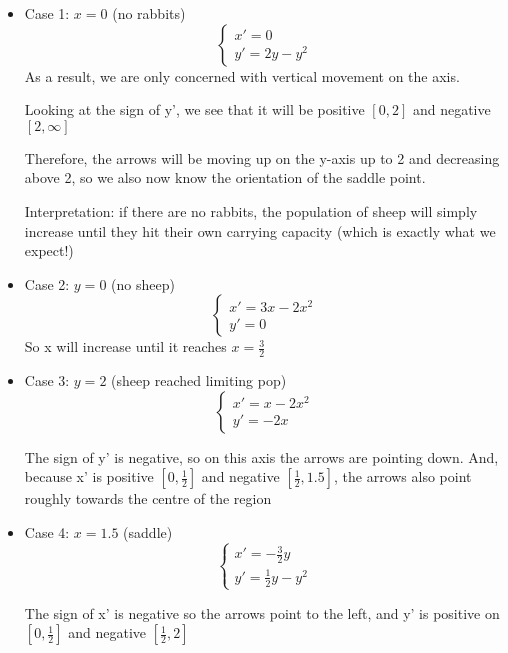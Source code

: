 \documentclass[12pt]{article}
\begin{document}
\begin{itemize}
    \item Case 1: $x = 0$ (no rabbits)
        \[\begin{cases}
            x' = 0\\
            y' = 2y - y^2
        \end{cases}\]
        As a result, we are only concerned with vertical movement on the axis.

        Looking at the sign of y', we see that it will be positive $[0, 2]$ and negative $[2, \infty]$

        Therefore, the arrows will be moving up on the y-axis up to 2 and decreasing above 2, so we also now know the orientation of the saddle point.

        Interpretation: if there are no rabbits, the population of sheep will simply increase until they hit their own carrying capacity (which is exactly what we expect!)

    \item Case 2: $y = 0$ (no sheep)
    \[\begin{cases}
        x' = 3x - 2x^2\\
        y' = 0
    \end{cases}\]
    So x will increase until it reaches $x = \frac{3}{2}$

    \item Case 3: $y = 2$ (sheep reached limiting pop)
        \[\begin{cases}
            x' = x - 2x^2\\
            y' = -2x
        \end{cases}\]

        The sign of y' is negative, so on this axis the arrows are pointing down. And, because x' is positive $[0, \frac{1}{2}]$ and negative $[\frac{1}{2}, 1.5]$, the arrows also point roughly towards the centre of the region 

    \item Case 4: $x = 1.5$ (saddle)
        \[\begin{cases}
            x' = - \frac{3}{2}y\\
            y' = \frac{1}{2}y - y^2
        \end{cases}\]

        The sign of x' is negative so the arrows point to the left, and y' is positive on $[0, \frac{1}{2}]$ and negative $[\frac{1}{2}, 2]$
\end{itemize}
\end{document}
